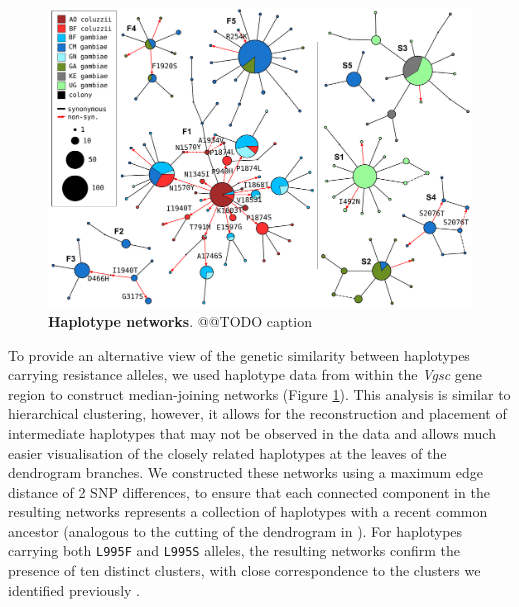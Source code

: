 \documentclass[a4paper,11pt,abstracton,hidelinks]{scrartcl}
\begin{document}
%
\begin{figure}[!b]
  \includegraphics[width=1.1\linewidth,center]{artwork/complete_networks.pdf}
  \caption{\textbf{Haplotype networks}. @@TODO caption}
  \label{fig:networks}
\end{figure}


%
To provide an alternative view of the genetic similarity between haplotypes carrying resistance alleles, we used haplotype data from within the \emph{Vgsc} gene region to construct median-joining networks (Figure \ref{fig:networks}).
%
This analysis is  similar to hierarchical clustering, however, it allows for the reconstruction and placement of intermediate haplotypes that may not be observed in the data and allows much easier visualisation of the closely related haplotypes at the leaves of the dendrogram branches.
%
We constructed these networks using a maximum edge distance of 2 SNP differences, to ensure that each connected component in the resulting networks represents a collection of haplotypes with a recent common ancestor (analogous to the cutting of the dendrogram in \cite{Ag1000gConsortium2017}).
%
For haplotypes carrying both \texttt{L995F} and \texttt{L995S} alleles, the resulting networks confirm the presence of ten distinct clusters, with close correspondence to the clusters we identified previously \cite{Ag1000gConsortium2017}.
%
\end{document}
